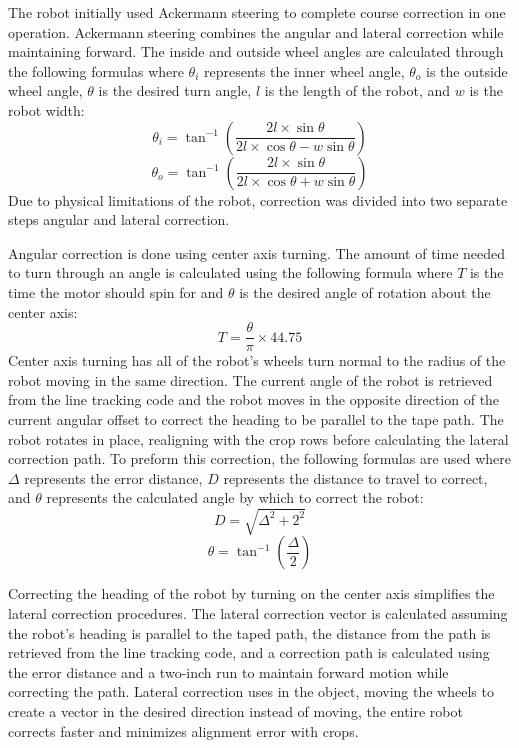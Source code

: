 \documentclass[11pt, hidelinks]{report}
\begin{document}
The robot initially used Ackermann steering to complete course correction in one operation. Ackermann steering combines the angular and lateral correction while maintaining forward. The inside and outside wheel angles are calculated through the following formulas where $\theta_i$ represents the inner wheel angle, $\theta_o$ is the outside wheel angle, $\theta$ is the desired turn angle, $l$ is the length of the robot, and $w$ is the robot width:
\begin{equation}
    \theta_i=\tan^{-1}\left(\frac{2l \times\sin\theta}{2l \times\cos\theta-w\sin\theta}\right)
\end{equation}
\begin{equation}
    \theta_o=\tan^{-1}\left(\frac{2l \times\sin\theta}{2l \times\cos\theta+w\sin\theta}\right)
\end{equation}
Due to physical limitations of the robot, correction was divided into two separate steps angular and lateral correction. 

Angular correction is done using center axis turning. The amount of time needed to turn through an angle is calculated using the following formula where $T$ is the time the motor should spin for and $\theta$ is the desired angle of rotation about the center axis:
\begin{equation}
    T=\frac{\theta}{\pi}\times44.75
\end{equation}
Center axis turning has all of the robot’s wheels turn normal to the radius of the robot moving in the same direction. The current angle of the robot is retrieved from the line tracking code and the robot moves in the opposite direction of the current angular offset to correct the heading to be parallel to the tape path. The robot rotates in place, realigning with the crop rows before calculating the lateral correction path. To preform this correction, the following formulas are used where $\Delta$ represents the error distance, $D$ represents the distance to travel to correct, and $\theta$ represents the calculated angle by which to correct the robot:
\begin{equation}
    D=\sqrt{\Delta^2+2^2}
\end{equation}
\begin{equation}
    \theta=\tan^{-1}\left(\frac{\Delta}{2}\right)
\end{equation}

Correcting the heading of the robot by turning on the center axis simplifies the lateral correction procedures. The lateral correction vector is calculated assuming the robot’s heading is parallel to the taped path, the distance from the path is retrieved from the line tracking code, and a correction path is calculated using the error distance and a two-inch run to maintain forward motion while correcting the path. Lateral correction uses  in the  object, moving the wheels to create a vector in the desired direction instead of moving, the entire robot corrects faster and minimizes alignment error with crops. 
\end{document}
